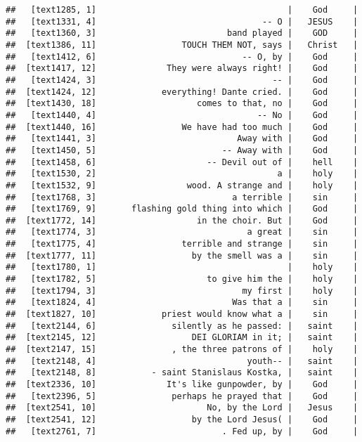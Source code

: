 \documentclass[]{article}
\begin{document}
\begin{verbatim}
##   [text1285, 1]                                      |    God     |
##   [text1331, 4]                                 -- O |   JESUS    |
##   [text1360, 3]                          band played |    GOD     |
##  [text1386, 11]                 TOUCH THEM NOT, says |   Christ   |
##   [text1412, 6]                             -- O, by |    God     |
##  [text1417, 12]              They were always right! |    God     |
##   [text1424, 3]                                   -- |    God     |
##  [text1424, 12]             everything! Dante cried. |    God     |
##  [text1430, 18]                    comes to that, no |    God     |
##   [text1440, 4]                                -- No |    God     |
##  [text1440, 16]                 We have had too much |    God     |
##   [text1441, 3]                            Away with |    God     |
##   [text1450, 5]                         -- Away with |    God     |
##   [text1458, 6]                      -- Devil out of |    hell    |
##   [text1530, 2]                                    a |    holy    |
##   [text1532, 9]                  wood. A strange and |    holy    |
##   [text1768, 3]                           a terrible |    sin     |
##   [text1769, 9]       flashing gold thing into which |    God     |
##  [text1772, 14]                    in the choir. But |    God     |
##   [text1774, 3]                              a great |    sin     |
##   [text1775, 4]                 terrible and strange |    sin     |
##  [text1777, 11]                   by the smell was a |    sin     |
##   [text1780, 1]                                      |    holy    |
##   [text1782, 5]                      to give him the |    holy    |
##   [text1794, 3]                             my first |    holy    |
##   [text1824, 4]                           Was that a |    sin     |
##  [text1827, 10]             priest would know what a |    sin     |
##   [text2144, 6]               silently as he passed: |   saint    |
##  [text2145, 12]                   DEI GLORIAM in it; |   saint    |
##  [text2147, 15]               , the three patrons of |    holy    |
##   [text2148, 4]                              youth-- |   saint    |
##   [text2148, 8]           - saint Stanislaus Kostka, |   saint    |
##  [text2336, 10]              It's like gunpowder, by |    God     |
##   [text2396, 5]               perhaps he prayed that |    God     |
##  [text2541, 10]                      No, by the Lord |   Jesus    |
##  [text2541, 12]                   by the Lord Jesus( |    God     |
##   [text2761, 7]                         . Fed up, by |    God     |

\end{verbatim}
\end{document}
